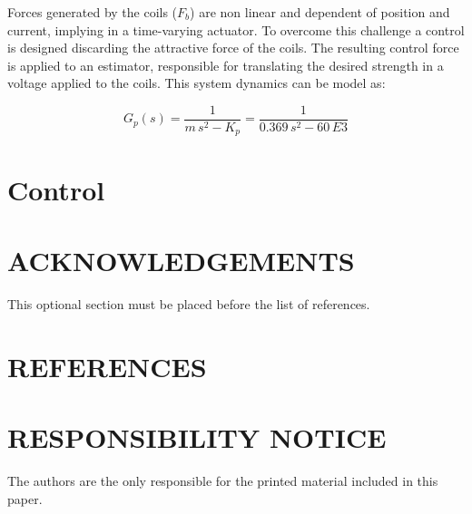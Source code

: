 \documentclass[10pt,fleqn,a4paper,twoside]{article}
\begin{document}
	Forces generated by the coils ($F_b$) are non linear and dependent of position and current, implying in a time-varying actuator. To overcome this challenge a control is designed discarding the attractive force of the coils. The resulting control force is applied to an estimator, responsible for translating the desired strength in a voltage applied to the coils. This system dynamics can be model as:
	
	\begin{equation}
		G_p(s) = \frac{1}{m \, s^2 - K_p} = \frac{1}{0.369 \, s^2 - 60 \,E3}
	\end{equation}


%
	
	\section{Control}
	
	\section{ACKNOWLEDGEMENTS}
	
	This optional section must be placed before the list of references.
	
	\section{REFERENCES} 
	
	
	\renewcommand{\refname}{}
	
	
	\section{RESPONSIBILITY NOTICE}
	
	The authors are the only responsible for the printed material included in this paper.
	
\end{document}
